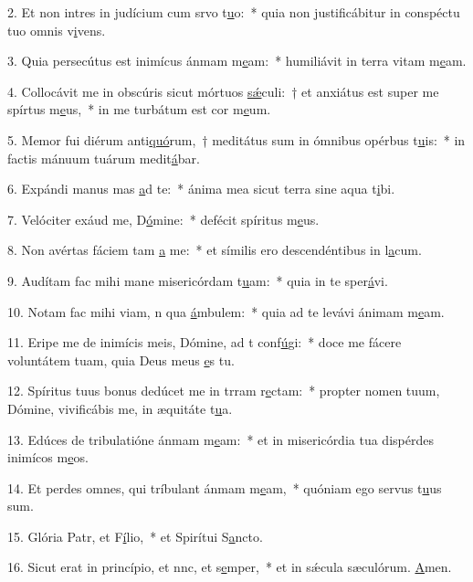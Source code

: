 2. Et non intres in judícium cum srvo t\uline{u}o:~* quia non justificábitur in conspéctu tuo omnis v\uline{i}vens.\par 
3. Quia persecútus est inimícus ánmam m\uline{e}am:~* humiliávit in terra vitam m\uline{e}am.\par 
4. Collocávit me in obscúris sicut mórtuos \uline{sǽ}culi:~† et anxiátus est super me spírtus m\uline{e}us,~* in me turbátum est cor m\uline{e}um.\par 
5. Memor fui diérum anti\uline{quó}rum,~† meditátus sum in ómnibus opérbus t\uline{u}is:~* in factis mánuum tuárum medit\uline{á}bar.\par 
6. Expándi manus mas \uline{a}d te:~* ánima mea sicut terra sine aqua t\uline{i}bi.\par 
7. Velóciter exáud me, D\uline{ó}mine:~* defécit spíritus m\uline{e}us.\par 
8. Non avértas fáciem tam \uline{a} me:~* et símilis ero descendéntibus in l\uline{a}cum.\par 
9. Audítam fac mihi mane misericórdam t\uline{u}am:~* quia in te sper\uline{á}vi.\par 
10. Notam fac mihi viam, n qua \uline{á}mbulem:~* quia ad te levávi ánimam m\uline{e}am.\par 
11. Eripe me de inimícis meis, Dómine, ad t conf\uline{ú}gi:~* doce me fácere voluntátem tuam, quia Deus meus \uline{e}s tu.\par 
12. Spíritus tuus bonus dedúcet me in trram r\uline{e}ctam:~* propter nomen tuum, Dómine, vivificábis me, in æquitáte t\uline{u}a.\par 
13. Edúces de tribulatióne ánmam m\uline{e}am:~* et in misericórdia tua dispérdes inimícos m\uline{e}os.\par 
14. Et perdes omnes, qui tríbulant ánmam m\uline{e}am,~* quóniam ego servus t\uline{u}us sum.\par 
15. Glória Patr, et F\uline{í}lio,~* et Spirítui S\uline{a}ncto.\par 
16. Sicut erat in princípio, et nnc, et s\uline{e}mper,~* et in sǽcula sæculórum. \uline{A}men.\par 
